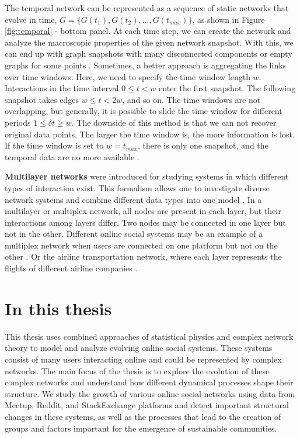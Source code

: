 The temporal network can be represented as a sequence of static networks that evolve in time, $G = \{ G(t_1), G(t_2), ..., G(t_{max})\}$, as shown in Figure \ref{fig:temporal} - bottom panel. At each time step, we can create the network and analyze the macroscopic properties of the given network snapshot. With this, we can end up with graph snapshots with many disconnected components or empty graphs for some points \cite{holme2015modern}. Sometimes, a better approach is aggregating the links over time windows. Here, we need to specify the time window length $w$. Interactions in the time interval $0\leq t<w$ enter the first snapshot. The following snapshot takes edges $w \leq t <2w$, and so on. The time windows are not overlapping, but generally, it is possible to slide the time window for different periods $ 1 \leq \delta t \geq w$. The downside of this method is that we can not recover original data points. The larger the time window is, the more information is lost. If the time window is set to $w=t_{max}$, there is only one snapshot, and the temporal data are no more available \cite{krings2012effects, arnold2021moving}. 

\textbf{Multilayer networks} were introduced for studying systems in which different types of interaction exist. This formalism allows one to investigate diverse network systems and combine different data types into one model \cite{porter2018multilayer}. In a multilayer or multiplex network, all nodes are present in each layer, but their interactions among layers differ. Two nodes may be connected in one layer but not in the other. Different online social systems may be an example of a multiplex network when users are connected on one platform but not on the other \cite{aleta2019multilayer}. Or the airline transportation network, where each layer represents the flights of different airline companies \cite{kivelamultilayer}.  


\section{In this thesis}

This thesis uses combined approaches of statistical physics and complex network theory to model and analyze evolving online social systems. These systems consist of many users interacting online and could be represented by complex networks. The main focus of the thesis is to explore the evolution of these complex networks and understand how different dynamical processes shape their structure. We study the growth of various online social networks using data from Meetup, Reddit, and StackExchange platforms and detect important structural changes in these systems, as well as the processes that lead to the creation of groups and factors important for the emergence of sustainable communities.

